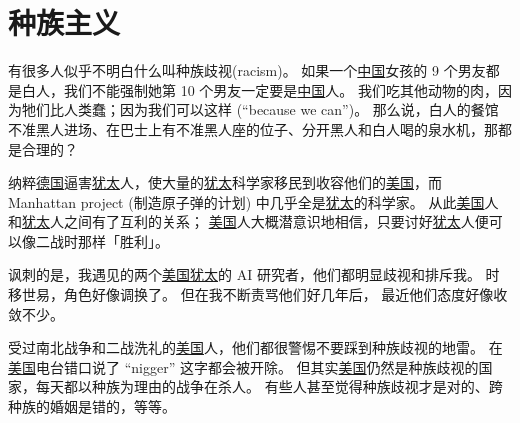 \documentclass[12pt]{report}
\newcommand{\cc}[2]{#1}
\newcommand{\cc}[2]{#2}
\begin{document}
{%


\chapter{\cc{种族主义}{Racism}}

\cc{
有很多人似乎不明白什么叫种族歧视(racism)。 如果一个\uline{中国}女孩的 9 个男友都是白人，我们不能强制她第 10 个男友一定要是\uline{中国}人。 我们吃其他动物的肉，因为牠们比人类蠢；因为我们可以这样 (``because we can'')。 那么说，白人的餐馆不准黑人进场、在巴士上有不准黑人座的位子、分开黑人和白人喝的泉水机，那都是合理的？
}{
	
}

\cc{
纳粹\uline{德国}逼害\uline{犹太}人，使大量的\uline{犹太}科学家移民到收容他们的\uline{美国}，而 Manhattan project (制造原子弹的计划) 中几乎全是\uline{犹太}的科学家。 从此\uline{美国}人和\uline{犹太}人之间有了互利的关系； \uline{美国}人大概潜意识地相信，只要讨好\uline{犹太}人便可以像二战时那样「胜利」。
}{
	
}

\cc{
讽刺的是，我遇见的两个\uline{美国}\uline{犹太}的 AI 研究者，他们都明显歧视和排斥我。 时移世易，角色好像调换了。 但在我不断责骂他们好几年后， 最近他们态度好像收敛不少。
}{
	
}

\cc{
受过南北战争和二战洗礼的\uline{美国}人，他们都很警惕不要踩到种族歧视的地雷。 在\uline{美国}电台错口说了 ``nigger'' 这字都会被开除。 但其实\uline{美国}仍然是种族歧视的国家，每天都以种族为理由的战争在杀人。 有些人甚至觉得种族歧视才是对的、跨种族的婚姻是错的，等等。
}{
	
}}
\end{document}
